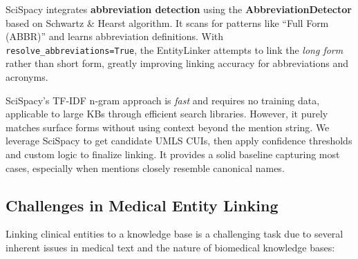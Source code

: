 SciSpacy integrates \textbf{abbreviation detection} using the \textbf{AbbreviationDetector} based on Schwartz \& Hearst algorithm. It scans for patterns like ``Full Form (ABBR)'' and learns abbreviation definitions. With \texttt{resolve\_abbreviations=True}, the EntityLinker attempts to link the \emph{long form} rather than short form, greatly improving linking accuracy for abbreviations and acronyms.

SciSpacy's TF-IDF n-gram approach is \emph{fast} and requires no training data, applicable to large KBs through efficient search libraries. However, it purely matches surface forms without using context beyond the mention string. We leverage SciSpacy to get candidate UMLS CUIs, then apply confidence thresholds and custom logic to finalize linking. It provides a solid baseline capturing most cases, especially when mentions closely resemble canonical names.

\subsection{Challenges in Medical Entity Linking}

Linking clinical entities to a knowledge base is a challenging task due to several inherent issues in medical text and the nature of biomedical knowledge bases:

